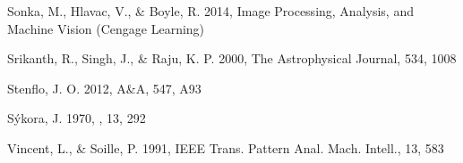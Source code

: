 \documentclass[manuscript]{aastex}	%
\begin{document}
\begin{thebibliography}{18}
Sonka, M., Hlavac, V., \& Boyle, R. 2014, Image Processing, Analysis, and
  Machine Vision (Cengage Learning)
 
 Srikanth, R., Singh, J., \& Raju, K. P. 2000, The Astrophysical Journal, 534, 1008  
 
Stenflo, J. O. 2012, A\&A, 547, A93

S{\'y}kora, J. 1970, \solphys, 13, 292

 Vincent, L., \& Soille, P. 1991, IEEE Trans. Pattern Anal. Mach. Intell., 13, 583
 
 


\end{thebibliography}



%
 
\end{document}
